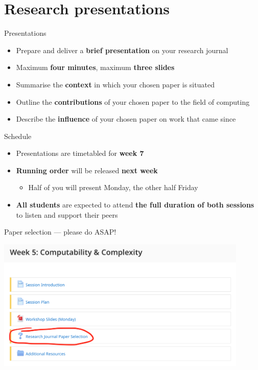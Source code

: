 \part{Research presentations}
\frame{\partpage}

\begin{frame}{Presentations}
    \begin{itemize}
        \pause\item Prepare and deliver a \textbf{brief presentation} on your research journal
        \pause\item Maximum \textbf{four minutes}, maximum \textbf{three slides}
        \pause\item Summarise the \textbf{context} in which your chosen paper is situated
        \pause\item Outline the \textbf{contributions} of your chosen paper to the field of computing
        \pause\item Describe the \textbf{influence} of your chosen paper on work that came since
    \end{itemize}
\end{frame}

\begin{frame}{Schedule}
    \begin{itemize}
        \pause\item Presentations are timetabled for \textbf{week 7}
        \pause\item \textbf{Running order} will be released \textbf{next week}
        \begin{itemize}
            \pause\item Half of you will present Monday, the other half Friday
        \end{itemize}
        \pause\item \textbf{All students} are expected to attend \textbf{the full duration of both sessions} to listen and support their peers
    \end{itemize}
\end{frame}

\begin{frame}{Paper selection --- please do ASAP!}
    \begin{center}
        \includegraphics[width=0.9\textwidth]{paper_selection}
    \end{center}
\end{frame}

